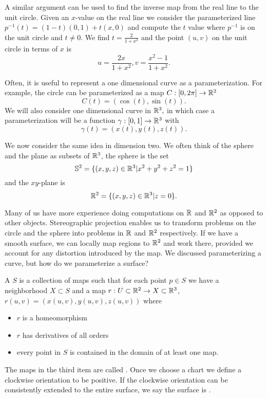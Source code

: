 A similar argument can be used to find the inverse map from
the real line to the unit circle. Given an $x$-value on the real line we consider
the parameterized line $p^{-1}(t)=(1-t)(0,1)+t(x,0)$ and compute
the $t$ value where $p^{-1}$ is on the unit circle and $t\neq 0.$ We find
$t=\frac{2}{1+x^2}$ and the point $(u,v)$ on the unit circle in terms of $x$ is
$$u=\frac{2x}{1+x^2}, v=\frac{x^2-1}{1+x^2}.$$



Often, it is useful to represent a one dimensional curve as a parameterization.
For example, the circle can be parameterized as a map $C:[0,2\pi]\rightarrow \mathbb{R}^2$
$$C(t)=\left(\cos(t),\sin(t)\right).$$ 
We will also consider one dimensional curve in $\mathbb{R}^3,$ in which case a parameterization
will be a function $\gamma:[0,1]\rightarrow \mathbb{R}^3$ with
$$\gamma(t)=\left(x(t),y(t),z(t)\right).$$



We now consider the same idea in dimension two.
We often think of the sphere and the plane as subsets of $\mathbb{R}^3$,
the sphere is the set
$$\mathbb{S}^2=\{(x,y,z)\in \mathbb{R}^3 | x^2+y^2+z^2=1\}$$
and the $xy$-plane is
$$\mathbb{R}^2=\{(x,y,z)\in \mathbb{R}^3 | z=0\}.$$




Many of us have more experience doing computations on $\mathbb{R}$ and $\mathbb{R}^2$ as opposed
to other objects. Stereographic projection enables us to transform problems on
the circle and the sphere into problems in $\mathbb{R}$ and $\mathbb{R}^2$ respectively.
If we have a smooth surface, we can locally map regions to $\mathbb{R}^2$ and work there,
provided we account for any distortion introduced by the map.
We discussed parameterizing a curve, but how do we parameterize a surface?



A  $S$ is a collection of maps such that
 for each point $p\in S$ we have a neighborhood $X\subset S$
 and a map $r:U\subset \mathbb{R}^2 \to X\subset \mathbb{R}^3$, $r(u,v)=(x(u,v),y(u,v),z(u,v))$
 where
 \begin{itemize}
 \item  $r$ is a homeomorphism
 \item $r$ has derivatives of all orders
 \item every point in $S$ is contained in the domain of at least one map.

\end{itemize}
The maps in the third item are called .
Once we choose a chart we define a clockwise orientation to be positive.
 If the clockwise orientation can be consistently extended to the entire surface, we say
the surface is .


